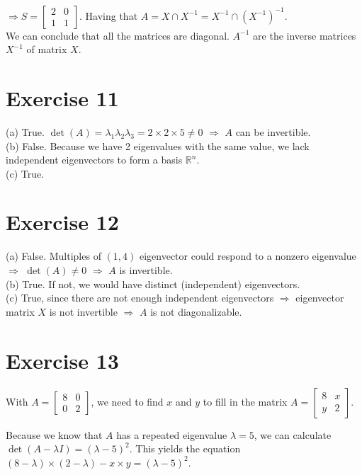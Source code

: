\documentclass{article}
\begin{document}
\\
$\Rightarrow S = \begin{bmatrix}
2 & 0  \\
1 & 1  
\end{bmatrix}$.
Having that $A = X \cap X^{-1} = X^{-1} \cap (X^{-1})^{-1}.$
\\ We can conclude that all the matrices are diagonal. $A^{-1}$ are the inverse matrices $X^{-1}$ of matrix $X$.
\section*{Exercise 11}
(a) True. \(\det(A) = \lambda_1 \lambda_2 \lambda_3 = 2 \times 2 \times 5 \neq 0\) \(\Rightarrow\) \(A\) can be invertible.
\\
(b) False. Because we have 2 eigenvalues with the same value, we lack independent eigenvectors to form a basis \(\mathbb{R}^n\).
\\
(c) True.


\section*{Exercise 12}
(a) False. Multiples of $(1,4)$ eigenvector could respond to a nonzero eigenvalue $\Rightarrow$ $\det(A) \neq 0$ $\Rightarrow$ $A$ is invertible.
\\
(b) True. If not, we would have distinct (independent) eigenvectors.
\\
(c) True, since there are not enough independent eigenvectors $\Rightarrow$ eigenvector matrix $X$ is not invertible $\Rightarrow$ $A$ is not diagonalizable.

\section*{Exercise 13}
With \(A=\begin{bmatrix}8 & 0 \\ 0 & 2 \end{bmatrix}\), we need to find \(x\) and \(y\) to fill in the matrix \(A=\begin{bmatrix} 8 & x \\ y & 2 \end{bmatrix}\). 

Because we know that \(A\) has a repeated eigenvalue \(\lambda = 5\), we can calculate \(\det(A - \lambda I) = (\lambda - 5)^2\). This yields the equation \((8 - \lambda) \times (2 - \lambda) - x \times y = (\lambda - 5)^2\).
\end{document}
